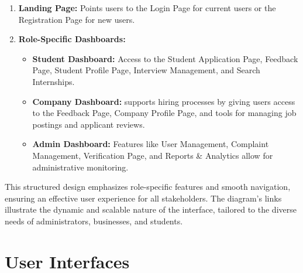 \begin{enumerate}
    \item \textbf{Landing Page:} Points users to the Login Page for current users or the Registration Page for new users.
    \item \textbf{Role-Specific Dashboards:}
    \begin{itemize}
        \item \textbf{Student Dashboard:} Access to the Student Application Page, Feedback Page, Student Profile Page, Interview Management, and Search Internships.
        \item \textbf{Company Dashboard:} supports hiring processes by giving users access to the Feedback Page, Company Profile Page, and tools for managing job postings and applicant reviews.
        \item \textbf{Admin Dashboard:} Features like User Management, Complaint Management, Verification Page, and Reports \& Analytics allow for administrative monitoring.
    \end{itemize}
\end{enumerate}

This structured design emphasizes role-specific features and smooth navigation, ensuring an effective user experience for all stakeholders. The diagram's links illustrate the dynamic and scalable nature of the interface, tailored to the diverse needs of administrators, businesses, and students.

\section{User Interfaces}
\label{sec:user_interfaces}%


